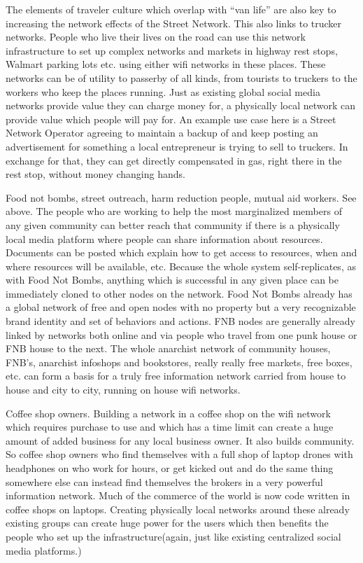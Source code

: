 The elements of traveler culture which overlap with ``van life'' are also key to increasing the network effects of the Street Network.  This also links to trucker networks.  People who live their lives on the road can use this network infrastructure to set up complex networks and markets in highway rest stops, Walmart parking lots etc. using either wifi networks in these places.  These networks can be of utility to passerby of all kinds, from tourists to truckers to the workers who keep the places running.  Just as existing global social media networks provide value they can charge money for, a physically local network can provide value which people will pay for.  An example use case here is a Street Network Operator agreeing to maintain a backup of and keep posting an advertisement for something a local entrepreneur is trying to sell to truckers.  In exchange for that, they can get directly compensated in gas, right there in the rest stop, without money changing hands.  


Food not bombs, street outreach, harm reduction people, mutual aid workers.  See above.  The people who are working to help the most marginalized members of any given community can better reach that community if there is a physically local media platform where people can share information about resources.  Documents can be posted which explain how to get access to resources, when and where resources will be available, etc.  Because the whole system self-replicates, as with Food Not Bombs, anything which is successful in any given place can be immediately cloned to other nodes on the network.  Food Not Bombs already has a global network of free and open nodes with no property but a very recognizable brand identity and set of behaviors and actions.  FNB nodes are generally already linked by networks both online and via people who travel from one punk house or FNB house to the next.  The whole anarchist network of community houses, FNB's, anarchist infoshops and bookstores, really really free markets, free boxes, etc. can form a basis for a truly free information network carried from house to house and city to city, running on house wifi networks.  

Coffee shop owners.  Building a network in a coffee shop on the wifi network which requires purchase to use and which has a time limit can create a huge amount of added business for any local business owner.  It also builds community. So coffee shop owners who find themselves with a full shop of laptop drones with headphones on who work for hours, or get kicked out and do the same thing somewhere else can instead find themselves the brokers in a very powerful information network.  Much of the commerce of the world is now code written in coffee shops on laptops.  Creating physically local networks around these already existing groups can create huge power for the users which then benefits the people who set up the infrastructure(again, just like existing centralized social media platforms.)

